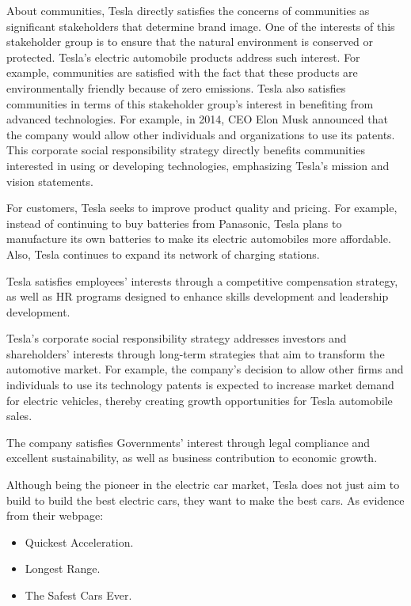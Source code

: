 \documentclass[12pt]{article}
\begin{document}
About communities, Tesla directly satisfies the concerns of communities as significant stakeholders that determine brand image. One of the interests of this stakeholder group is to ensure that the natural environment is conserved or protected. Tesla's electric automobile products address such interest. For example, communities are satisfied with the fact that these products are environmentally friendly because of zero emissions. Tesla also satisfies communities in terms of this stakeholder group's interest in benefiting from advanced technologies. For example, in 2014, CEO Elon Musk announced that the company would allow other individuals and organizations to use its patents. This corporate social responsibility strategy directly benefits communities interested in using or developing technologies, emphasizing Tesla's mission and vision statements.

For customers, Tesla seeks to improve product quality and pricing. For example, instead of continuing to buy batteries from Panasonic, Tesla plans to manufacture its own batteries to make its electric automobiles more affordable. Also, Tesla continues to expand its network of charging stations.

Tesla satisfies employees' interests through a competitive compensation strategy, as well as HR programs designed to enhance skills development and leadership development.

Tesla's corporate social responsibility strategy addresses investors and shareholders' interests through long-term strategies that aim to transform the automotive market. For example, the company's decision to allow other firms and individuals to use its technology patents is expected to increase market demand for electric vehicles, thereby creating growth opportunities for Tesla automobile sales.

The company satisfies Governments' interest through legal compliance and excellent sustainability, as well as business contribution to economic growth.

Although being the pioneer in the electric car market, Tesla does not just aim to build to build the best electric cars, they want to make the best cars. As evidence from their webpage:

\begin{itemize}
	\item{Quickest Acceleration.}
	\item{Longest Range.}
	\item{The Safest Cars Ever.}
\end{itemize}
\end{document}

